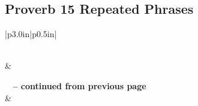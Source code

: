 \subsection{Proverb 15 Repeated Phrases}


\normalsize
 
\begin{center}
\begin{longtable}{|p{3.0in}|p{0.5in}|}
\caption[Proverb 15 Repeated Phrases]{Proverb 15 Repeated Phrases}\label{table:Repeated Phrases Proverb 15} \\
\hline {} &  \\ \hline 
\endfirsthead
 
{{\bfseries \tablename\ \thetable{} -- continued from previous page}} \\  
\hline {} &  \\ \hline 
\endhead
 

\end{longtable}
\end{center}
